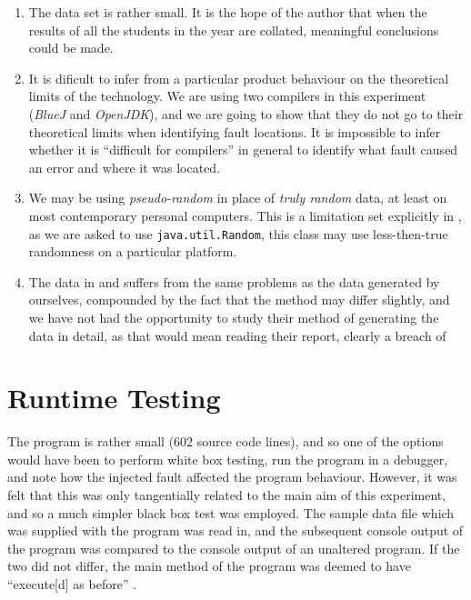 \documentclass[10pt]{report}
\begin{document}
\begin{enumerate}
\item The data set is rather small.  It is the hope of the author that when the results of all the students in the year are collated, meaningful conclusions could be made.

\item It is dificult to infer from a particular product behaviour on the theoretical limits of the technology.  We are using two compilers in this experiment ({\em BlueJ} and {\em OpenJDK}), and we are going to show that they do not go to their theoretical limits when identifying fault locations.  It is impossible to infer whether it is ``difficult for compilers'' in general to identify what fault caused an error and where it was located.

\item We may be using {\em pseudo-random} in place of {\em truly random} data, at least on most contemporary personal computers.  This is a limitation set explicitly in \cite{bradley}, as we are asked to use {\tt java.util.Random}, this class may use less-then-true randomness on a particular platform.

\item The data in \cite{nugee} and \cite{hoad} suffers from the same problems as the data generated by ourselves, compounded by the fact that the method may differ slightly, and we have not had the opportunity to study their method of generating the data in detail, as that would mean reading their report, clearly a breach of \cite[§6.3.5]{plagiarism}

\end{enumerate}


\section{Runtime Testing}

The program is rather small (602 source code lines), and so one of the options would have been to perform white box testing, run the program in a debugger, and note how the injected fault affected the program behaviour.  However, it was felt that this was only tangentially related to the main aim of this experiment, and so a much simpler black box test was employed.  The sample data file which was supplied with the program was read in, and the subsequent console output of the program was compared to the console output of an unaltered program.  If the two did not differ, the main method of the program was deemed to have ``execute[d] as before'' \cite[p2]{bradley}.
\end{document}
